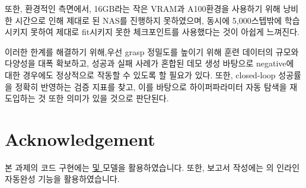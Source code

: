 \documentclass[11pt,a4paper]{article}
\begin{document}
또한, 환경적인 측면에서, 16GB라는 작은 VRAM과 A100환경을 사용하기 위해 낭비한 시간으로 인해 제대로 된 NAS를 진행하지 못하였으며, 동시에 5,000스텝밖에 학습시키지 못하여 제대로 fit시키지 못한 체크포인트를 사용했다는 것이 아쉽게 느껴진다.

이러한 한계를 해결하기 위해,우선 grasp 정밀도를 높이기 위해 훈련 데이터의 규모와 다양성을 대폭 확보하고, 성공과 실패 사례가 혼합된 데모 생성 바탕으로 negative에 대한 경우에도 정상적으로 작동할 수 있도록 할 필요가 있다. 또한, closed-loop 성공률을 정확히 반영하는 검증 지표를 찾고, 이를 바탕으로 하이퍼파라미터 자동 탐색을 재도입하는 것 또한 의미가 있을 것으로 판단된다.

\section*{Acknowledgement}
본 과제의 코드 구현에는 \href{https://claude.ai/}{ 및 } 모델을 활용하였습니다. 또한, 보고서 작성에는 \href{https://cursor.com/help/ai-features/tab}{}의 인라인 자동완성 기능을 활용하였습니다.
\end{document}
